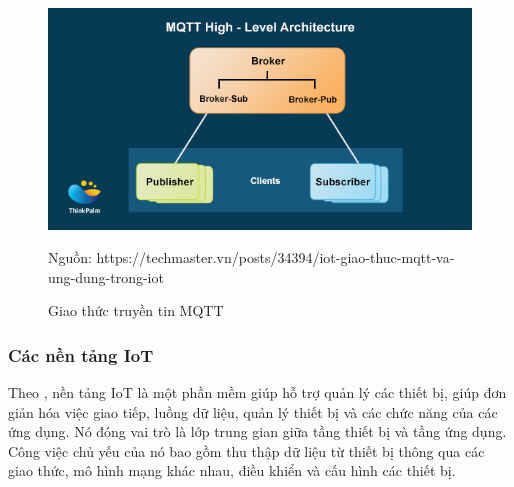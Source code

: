 \clearpage

\begin{figure}[h!]
	\center
	\includegraphics[scale=0.6]{image/mqtt}\\
	\caption{Giao thức truyền tin MQTT}
	Nguồn: https://techmaster.vn/posts/34394/iot-giao-thuc-mqtt-va-ung-dung-trong-iot
\end{figure} 




\subsubsection{Các nền tảng IoT}
Theo \cite{iotplatform}, nền tảng IoT là một phần mềm giúp hỗ trợ quản lý các thiết bị, giúp đơn giản hóa việc giao tiếp, luồng dữ liệu, quản lý thiết bị và các chức năng của các ứng dụng. Nó đóng vai trò là lớp trung gian giữa tầng thiết bị và tầng ứng dụng. Công việc chủ yếu của nó bao gồm thu thập dữ liệu từ thiết bị thông qua các giao thức, mô hình mạng khác nhau, điều khiển và cấu hình các thiết bị. 
\clearpage

